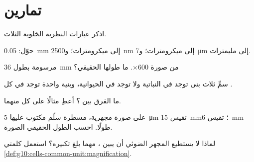 \section{تمارين}

\begin{exercise}[$\star$]\label{exo:g10:cells-common-unit:1}
اذكر عبارات النظرية الخلوية الثلاث.
\end{exercise}

\begin{exercise}[$\star$]\label{exo:g10:cells-common-unit:2}
حوّل: \qty{0.05}{mm} إلى ميكرومترات؛ و\qty{2500}{nm} إلى ميكرومترات؛
و\qty{7}{\micro m} إلى مليمترات.
\end{exercise}

\begin{exercise}[$\star$]\label{exo:g10:cells-common-unit:3}
 مرسومة بطول \qty{36}{mm} من صورة  $\times 600$. ما طولها
الحقيقي؟
\end{exercise}

\begin{exercise}[$\star$]\label{exo:g10:cells-common-unit:4}
سمِّ ثلاث بنى توجد في  النباتية ولا توجد في  الحيوانية،
وبنية واحدة توجد في كل .
\end{exercise}

\begin{exercise}[$\star$]\label{exo:g10:cells-common-unit:5}
ما الفرق بين  ؟ أعطِ مثالًا على
كل منهما.
\end{exercise}

\begin{exercise}[$\star\star$]\label{exo:g10:cells-common-unit:6}
على صورة مجهرية، مسطرة سلّم مكتوب عليها \qty{5}{\micro m} تقيس
\qty{15}{mm}؛  تقيس \qty{6}{mm} طولًا. احسب الطول الحقيقي
  الصورة.
\end{exercise}

\begin{exercise}[$\star\star$]\label{exo:g10:cells-common-unit:7}
لماذا لا يستطيع المجهر الضوئي أن يبين ، مهما بلغ تكبيره؟
استعمل كلمتي \cref{def:g10:cells-common-unit:magnification}.
\end{exercise}

